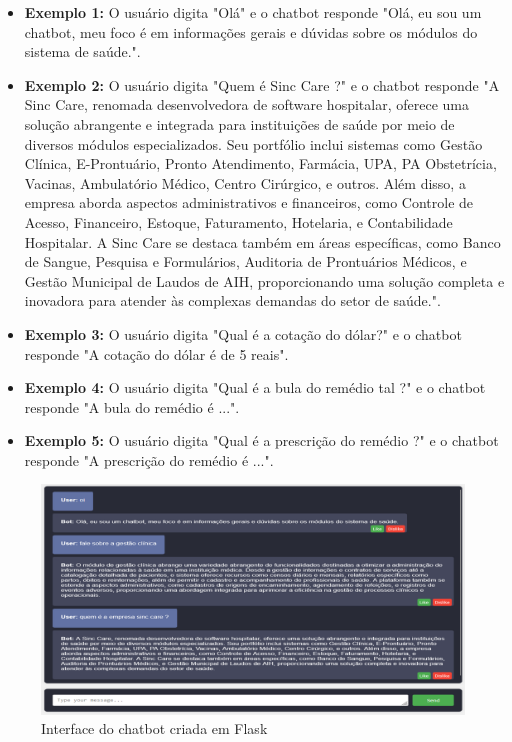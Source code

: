 \documentclass[conference]{IEEEtran}
\begin{document}
\begin{itemize}
\item \textbf{Exemplo 1:} O usuário digita "Olá" e o chatbot responde "Olá, eu sou um chatbot, 
meu foco é em informações gerais e dúvidas sobre os módulos do sistema de saúde.".

\item \textbf{Exemplo 2:} O usuário digita "Quem é Sinc Care ?" e o chatbot responde 
"A Sinc Care, renomada desenvolvedora de software hospitalar, oferece uma solução abrangente e 
integrada para instituições de saúde por meio de diversos módulos especializados. Seu portfólio inclui 
sistemas como Gestão Clínica, E-Prontuário, Pronto Atendimento, Farmácia, UPA, PA Obstetrícia, Vacinas, 
Ambulatório Médico, Centro Cirúrgico, e outros. 
Além disso, a empresa aborda aspectos administrativos e financeiros, como Controle de Acesso, Financeiro, 
Estoque, Faturamento, Hotelaria, e Contabilidade Hospitalar. A Sinc Care se destaca também em áreas específicas, 
como Banco de Sangue, Pesquisa e Formulários, Auditoria de Prontuários Médicos, e Gestão Municipal de Laudos de AIH, 
proporcionando uma solução completa e inovadora para atender às complexas demandas do setor de saúde.".

\item \textbf{Exemplo 3:} O usuário digita "Qual é a cotação do dólar?" e o chatbot responde "A cotação do dólar é de 5 reais".
\item \textbf{Exemplo 4:} O usuário digita "Qual é a bula do remédio tal ?" e o chatbot responde "A bula do remédio é ...".
\item \textbf{Exemplo 5:} O usuário digita "Qual é a prescrição do remédio ?" e o chatbot responde "A prescrição do remédio é ...".
\end{itemize}   

\begin{figure}[htbp]
    \centerline{\includegraphics[scale=0.27]{chat.png}}
    \caption{Interface do chatbot criada em Flask}
    \label{fig2}
\end{figure}
\end{document}

